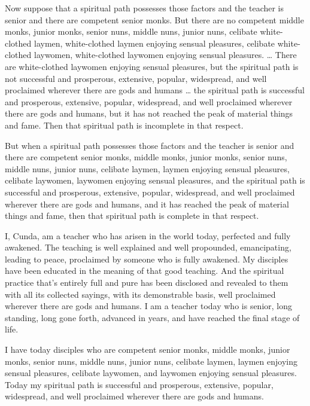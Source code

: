 \documentclass[12pt,openany]{book}%
\begin{document}
Now suppose that a spiritual path possesses those factors and the teacher is senior and there are competent senior monks. But there are no competent middle monks, junior monks, senior nuns, middle nuns, junior nuns, celibate white-clothed laymen, white-clothed laymen enjoying sensual pleasures, celibate white-clothed laywomen, white-clothed laywomen enjoying sensual pleasures. … There are white-clothed laywomen enjoying sensual pleasures, but the spiritual path is not successful and prosperous, extensive, popular, widespread, and well proclaimed wherever there are gods and humans … the spiritual path is successful and prosperous, extensive, popular, widespread, and well proclaimed wherever there are gods and humans, but it has not reached the peak of material things and fame. Then that spiritual path is incomplete in that respect. 

But when a spiritual path possesses those factors and the teacher is senior and there are competent senior monks, middle monks, junior monks, senior nuns, middle nuns, junior nuns, celibate laymen, laymen enjoying sensual pleasures, celibate laywomen, laywomen enjoying sensual pleasures, and the spiritual path is successful and prosperous, extensive, popular, widespread, and well proclaimed wherever there are gods and humans, and it has reached the peak of material things and fame, then that spiritual path is complete in that respect. 

I, Cunda, am a teacher who has arisen in the world today, perfected and fully awakened. The teaching is well explained and well propounded, emancipating, leading to peace, proclaimed by someone who is fully awakened. My disciples have been educated in the meaning of that good teaching. And the spiritual practice that’s entirely full and pure has been disclosed and revealed to them with all its collected sayings, with its demonstrable basis, well proclaimed wherever there are gods and humans. I am a teacher today who is senior, long standing, long gone forth, advanced in years, and have reached the final stage of life. 

I have today disciples who are competent senior monks, middle monks, junior monks, senior nuns, middle nuns, junior nuns, celibate laymen, laymen enjoying sensual pleasures, celibate laywomen, and laywomen enjoying sensual pleasures. Today my spiritual path is successful and prosperous, extensive, popular, widespread, and well proclaimed wherever there are gods and humans. 
\end{document}
